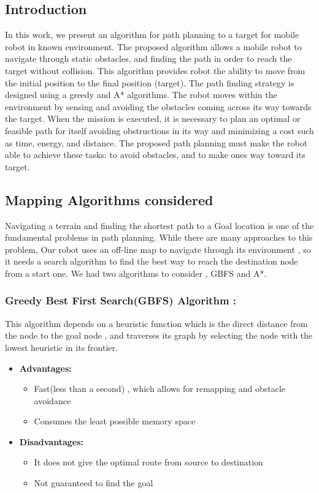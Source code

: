 \documentclass[12pt]{article}
\begin{document}
\subsection{Introduction}
In this work, we present an algorithm for path planning to a target for mobile robot in known environment. The proposed algorithm allows a mobile robot to navigate through static obstacles, and finding the path in order to reach the target without collision. This algorithm provides robot the ability to move from the initial position to the final position (target). The path finding strategy is designed using a greedy and A* algorithms. The robot moves within the environment by sensing and avoiding the obstacles coming across its way towards the target. When the mission is executed, it is necessary to plan an optimal or feasible path for itself avoiding obstructions in its way and minimizing a cost such as time, energy, and distance. The proposed path planning must make the robot able to achieve these tasks: to avoid obstacles, and to make ones way toward its target. 

\subsection{Mapping Algorithms considered}
Navigating a terrain and finding the shortest path to a Goal location is one of the fundamental problems in path planning. While there are many approaches to this problem, Our robot uses an off-line map to navigate through its environment , so it needs a search algorithm to find the best way to reach the destination node from a start one. We had two algorithms to consider , GBFS and A*.

\subsubsection{Greedy Best First Search(GBFS) Algorithm :}
This algorithm depends on a heuristic function which is the direct distance from the node to the goal node , and traverses its graph by selecting the node with the lowest heuristic in its frontier.

\begin{itemize}
	\item \textbf{Advantages:}
		\begin{itemize}
			\item Fast(less than a second) , which allows for remapping and obstacle avoidance
			\item Consumes the least possible memory space
			
		\end{itemize}
	\item \textbf{Disadvantages:}
		\begin{itemize}
			\item It does not give the optimal route from source to destination
			\item Not guaranteed to find the goal
			
		\end{itemize}
\end{itemize}
\end{document}
